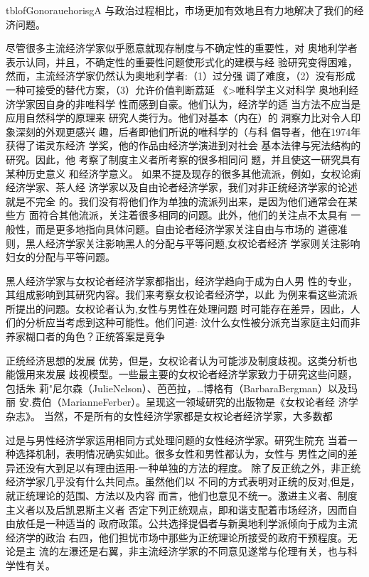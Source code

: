tblofGonorauehorisgA
与政治过程相比，市场更加有效地且有力地解决了我们的经济问题。

尽管很多主流经济学家似乎愿意就现存制度与不确定性的重要性，对
奥地利学者表示认同，并且，不确定性的重要性问题使形式化的建模与经
验研究变得困难，然而，主流经济学家仍然认为奥地利学者:（1）过分强
调了难度，（2）没有形成一种可接受的替代方案，（3）允许价值判断荔延
《>唯科学主义对科学
奥地利经济学家因自身的非唯科学
性而感到自豪。他们认为，经济学的适
当方法不应当是应用自然科学的原理来
研究人类行为。他们对基本（内在）的
洞察力比对令人印象深刻的外观更感兴
趣，后者即他们所说的唯科学的（与科
倡导者，他在1974年获得了诺灵东经济
学奖，他的作品由经济学演进到对社会
基本法律与宪法结构的研究。因此，他
考察了制度主义者所考察的很多相同问
题，并且使这一研究具有某种历史意义
和经济学意义。
如果不提及现存的很多其他流派，例如，女权论痢经济学家、茶人经
济学家以及自由论者经济学家，我们对非正统经济学家的论述就是不完全
的。我们没有将他们作为单独的流派列出来，是因为他们通常会在某些方
面符合其他流派，关注着很多相同的问题。此外，他们的关注点不太具有
一般性，而是更多地指向具体问题。自由论者经济学家关注自由与市场的
道德准则，黑人经济学家关注影响黑人的分配与平等问题,女权论者经济
学家则关注影响妇女的分配与平等问题。

黑人经济学家与女权论者经济学家都指出，经济学趋向于成为白人男
性的专业，其组成影响到其研究内容。我们来考察女权论者经济学，以此
为例来看这些流派所提出的问题。女权论者认为,女性与男性在处理问题
时可能存在差异，因此，人们的分析应当考虑到这种可能性。他们问道:
汶什么女性被分派充当家庭主妇而非养家糊口者的角色？正统答案是竞争

正统经济思想的发展
优势，但是，女权论者认为可能涉及制度歧视。这类分析也能饿用来发展
歧视模型。一些最主要的女权论者经济学家致力于研究这些问题，包括朱
莉"尼尔森（JulieNelson）、芭芭拉，…博格有（BarbaraBergman）以及玛丽
安.费伯（MarianneFerber）。呈现这一领域研究的出版物是《女权论者经
济学杂志》。
当然，不是所有的女性经济学家都是女权论者经济学家，大多数都

过是与男性经济学家运用相同方式处理问题的女性经济学家。研究生院充
当着一种选择机制，表明情况确实如此。很多女性和男性都认为，女性与
男性之间的差异还没有大到足以有理由运用-一种单独的方法的程度。
除了反正统之外，非正统经济学家几乎没有什么共同点。虽然他们以
不同的方式表明对正统的反对,但是，就正统理论的范围、方法以及内容
而言，他们也意见不统一。激进主义者、制度主义者以及后凯恩斯主义者
否定下列正统观点，即和谐支配着市场经济，因而自由放任是一种适当的
政府政策。公共选择提倡者与新奥地利学派倾向于成为主流经济学的政治
右四，他们担忧市场中那些为正统理论所接受的政府干预程度。无论是主
流的左瀑还是右翼，非主流经济学家的不同意见遂常与伦理有关，也与科
学性有关。

